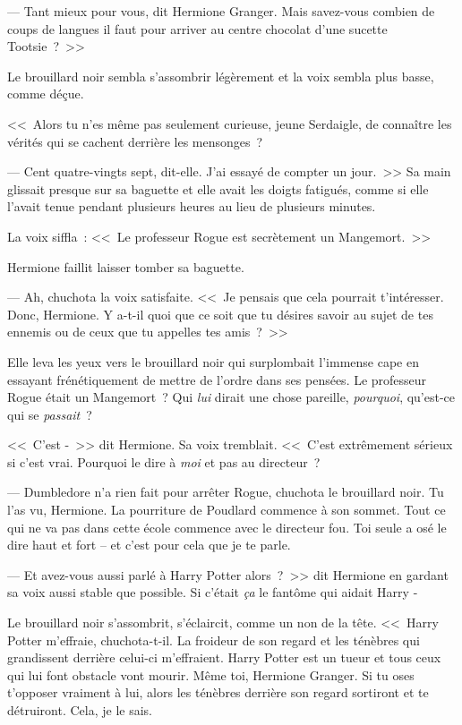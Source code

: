 --- Tant mieux pour vous, dit Hermione Granger. Mais savez-vous combien de coups de langues il faut pour arriver au centre chocolat d'une sucette Tootsie~?~>>

Le brouillard noir sembla s'assombrir légèrement et la voix sembla plus basse, comme déçue.

<<~Alors tu n'es même pas seulement curieuse, jeune Serdaigle, de connaître les vérités qui se cachent derrière les mensonges~?

--- Cent quatre-vingts sept, dit-elle. J'ai essayé de compter un jour.~>> Sa main glissait presque sur sa baguette et elle avait les doigts fatigués, comme si elle l'avait tenue pendant plusieurs heures au lieu de plusieurs minutes.

La voix siffla~: <<~Le professeur Rogue est secrètement un Mangemort.~>>

Hermione faillit laisser tomber sa baguette.

--- Ah, chuchota la voix satisfaite. <<~Je pensais que cela pourrait t'intéresser. Donc, Hermione. Y a-t-il quoi que ce soit que tu désires savoir au sujet de tes ennemis ou de ceux que tu appelles tes amis~?~>>

Elle leva les yeux vers le brouillard noir qui surplombait l'immense cape en essayant frénétiquement de mettre de l'ordre dans ses pensées. Le professeur Rogue était un Mangemort~? Qui \emph{lui} dirait une chose pareille, \emph{pourquoi}, qu'est-ce qui se \emph{passait}~?

<<~C'est -~>> dit Hermione. Sa voix tremblait. <<~C'est extrêmement sérieux si c'est vrai. Pourquoi le dire à \emph{moi} et pas au directeur~?

--- Dumbledore n'a rien fait pour arrêter Rogue, chuchota le brouillard noir. Tu l'as vu, Hermione. La pourriture de Poudlard commence à son sommet. Tout ce qui ne va pas dans cette école commence avec le directeur fou. Toi seule a osé le dire haut et fort -- et c'est pour cela que je te parle.

--- Et avez-vous aussi parlé à Harry Potter alors~?~>> dit Hermione en gardant sa voix aussi stable que possible. Si c'était \emph{ça} le fantôme qui aidait Harry -

Le brouillard noir s'assombrit, s'éclaircit, comme un non de la tête. <<~Harry Potter m'effraie, chuchota-t-il. La froideur de son regard et les ténèbres qui grandissent derrière celui-ci m'effraient. Harry Potter est un tueur et tous ceux qui lui font obstacle vont mourir. Même toi, Hermione Granger. Si tu oses t'opposer vraiment à lui, alors les ténèbres derrière son regard sortiront et te détruiront. Cela, je le sais.


